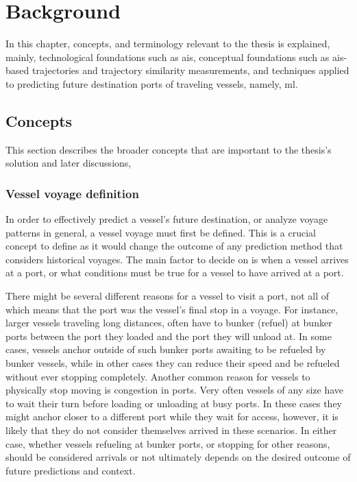 \chapter{Background}

In this chapter, concepts, and terminology relevant to the thesis is explained, mainly, technological foundations such as \acrfull{ais}, conceptual foundations such as \acrshort{ais}-based trajectories and trajectory similarity measurements, and techniques applied to predicting future destination ports of traveling vessels, namely, \acrfull{ml}.

\section{Concepts}

This section describes the broader concepts that are important to the thesis's solution and later discussions,

\subsection{Vessel voyage definition}
\label{sec:vessel_voyage_definition}

In order to effectively predict a vessel's future destination, or analyze voyage patterns in general, a vessel voyage must first be defined. This is a crucial concept to define as it would change the outcome of any prediction method that considers historical voyages. The main factor to decide on is when a vessel arrives at a port, or what conditions must be true for a vessel to have arrived at a port.

There might be several different reasons for a vessel to visit a port, not all of which means that the port was the vessel's final stop in a voyage. For instance, larger vessels traveling long distances, often have to bunker (refuel) at bunker ports between the port they loaded and the port they will unload at. In some cases, vessels anchor outside of such bunker ports awaiting to be refueled by bunker vessels, while in other cases they can reduce their speed and be refueled without ever stopping completely. Another common reason for vessels to physically stop moving is congestion in ports. Very often vessels of any size have to wait their turn before loading or unloading at busy ports. In these cases they might anchor closer to a different port while they wait for access, however, it is likely that they do not consider themselves arrived in these scenarios. In either case, whether vessels refueling at bunker ports, or stopping for other reasons, should be considered arrivals or not ultimately depends on the desired outcome of future predictions and context.

